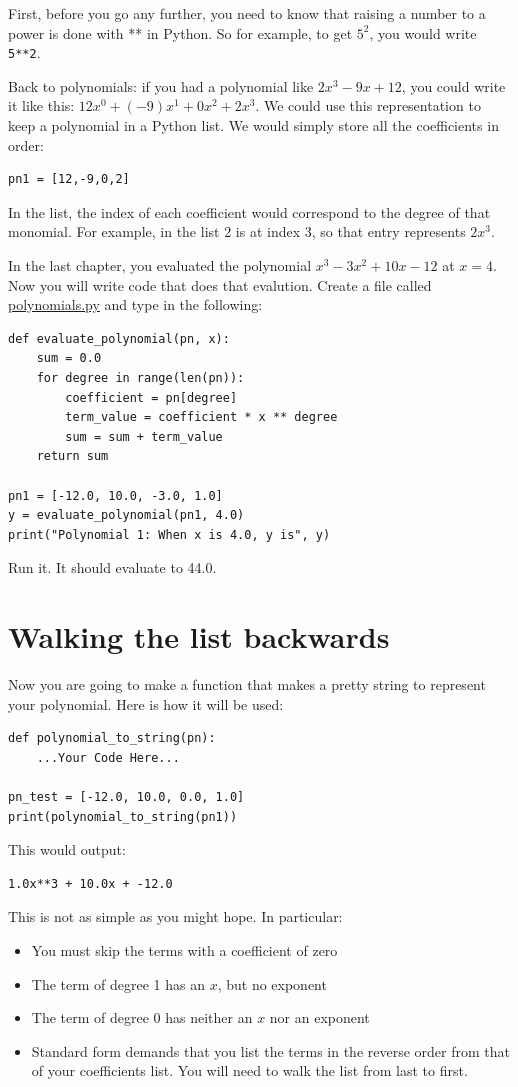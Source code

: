 First, before you go any further, you need to know that raising a
number to a power is done with ** in Python.  So for example, to get
$5^2$, you would write \texttt{5**2}.

Back to polynomials: if you had a polynomial like $2x^3 -9x + 12$, you
could write it like this: $12x^0 + (-9)x^1 + 0x^2 + 2x^3$.  We could
use this representation to keep a polynomial in a Python list. We
would simply store all the coefficients in order:
\begin{Verbatim}
pn1 = [12,-9,0,2]
\end{Verbatim}

In the list, the index of each coefficient would correspond to the
degree of that monomial. For example, in the list 2 is at index 3, so
that entry represents $2x^3$.

In the last chapter, you evaluated the polynomial $x^3 - 3x^2 + 10x -
12$ at $x=4$. Now you will write code that does that evalution.
Create a file called \url{polynomials.py} and type in the following:

\begin{Verbatim}
def evaluate_polynomial(pn, x):
    sum = 0.0  
    for degree in range(len(pn)):
        coefficient = pn[degree]
        term_value = coefficient * x ** degree
        sum = sum + term_value
    return sum
   
pn1 = [-12.0, 10.0, -3.0, 1.0]
y = evaluate_polynomial(pn1, 4.0)
print("Polynomial 1: When x is 4.0, y is", y)
\end{Verbatim}

Run it. It should evaluate to 44.0.

\section{Walking the list backwards}

Now you are going to make a function that makes a pretty string to
represent your polynomial. Here is how it will be used:
\begin{Verbatim}
def polynomial_to_string(pn):
    ...Your Code Here...

pn_test = [-12.0, 10.0, 0.0, 1.0]
print(polynomial_to_string(pn1))
\end{Verbatim}

This would output:
\begin{Verbatim}
1.0x**3 + 10.0x + -12.0
\end{Verbatim}
This is not as simple as you might hope. In particular:
\begin{itemize}
\item You must skip the terms with a coefficient of zero
\item The term of degree 1 has an $x$, but no exponent
\item The term of degree 0 has neither an $x$ nor an exponent
\item Standard form demands that you list the terms in the reverse
  order from that of your coefficients list. You will need to walk the
  list from last to first.
\end{itemize}

